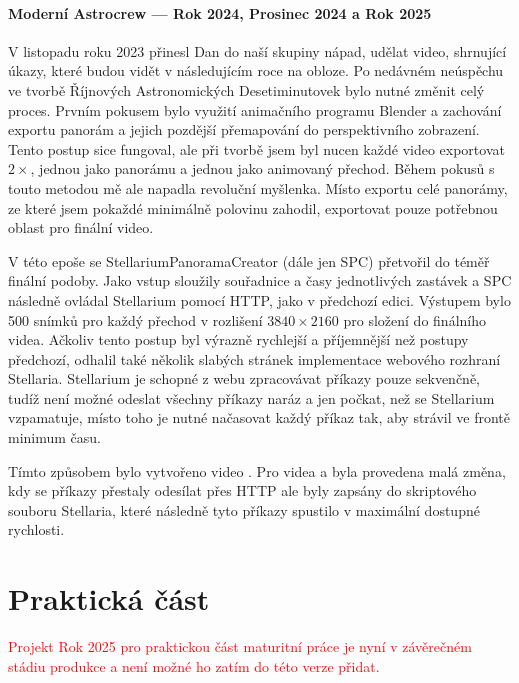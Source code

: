 \documentclass[12pt,a4paper,titlepage]{article}
\begin{document}
\subsection{Moderní Astrocrew --- Rok 2024, Prosinec 2024 a Rok 2025}
V listopadu roku 2023 přinesl Dan do naší skupiny nápad, udělat video, shrnující úkazy, které budou vidět v následujícím roce na obloze. Po nedávném neúspěchu ve tvorbě Říjnových Astronomických Desetiminutovek bylo nutné změnit celý proces. Prvním pokusem bylo využití animačního programu Blender a zachování exportu panorám a jejich pozdější přemapování do perspektivního zobrazení. Tento postup sice fungoval, ale při tvorbě jsem byl nucen každé video exportovat \(2\times \), jednou jako panorámu a jednou jako animovaný přechod. Během pokusů s touto metodou mě ale napadla revoluční myšlenka. Místo exportu celé panorámy, ze které jsem pokaždé minimálně polovinu zahodil, exportovat pouze potřebnou oblast pro finální video. 

V této epoše se StellariumPanoramaCreator (dále jen SPC) přetvořil do téměř finální podoby. Jako vstup sloužily souřadnice a časy jednotlivých zastávek a SPC následně ovládal Stellarium pomocí HTTP, jako v předchozí edici. Výstupem bylo 500 snímků pro každý přechod v rozlišení \(3840\times2160\) pro složení do finálního videa. Ačkoliv tento postup byl výrazně rychlejší a příjemnější než postupy předchozí, odhalil také několik slabých stránek implementace webového rozhraní Stellaria. Stellarium je schopné z webu zpracovávat příkazy pouze sekvenčně, tudíž není možné odeslat všechny příkazy naráz a jen počkat, než se Stellarium vzpamatuje, místo toho je nutné načasovat každý příkaz tak, aby strávil ve frontě minimum času.

Tímto způsobem bylo vytvořeno video . Pro videa  a  byla provedena malá změna, kdy se příkazy přestaly odesílat přes HTTP ale byly zapsány do skriptového souboru Stellaria, které následně tyto příkazy spustilo v maximální dostupné rychlosti.
\newpage
\part{Praktická část}
\textcolor{red}{Projekt Rok 2025 pro praktickou část maturitní práce je nyní v závěrečném stádiu produkce a není možné ho zatím do této verze přidat.}
\newpage
\end{document}
